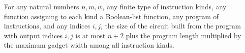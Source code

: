 \begin{theorem}
\label{BoolCircuit.progCircuit_size_le}
\leanok
{}
For any natural numbers $n,m,w$, any finite type of instruction kinds, any function
assigning to each kind a Boolean-list function, any program of instructions, and any
indices $i,j$, the size of the circuit built from the program with output indices $i,j$
is at most $n+2$ plus the program length multiplied by the maximum gadget width among
all instruction kinds.
\end{theorem}
